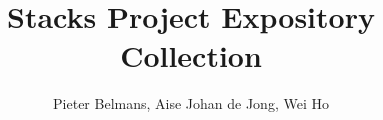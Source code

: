 \documentclass[conferencestyle]{cambridge7B}
\theoremstyle{plain}
\theoremstyle{definition}
\theoremstyle{definition}
\begin{document}
\title{Stacks Project Expository Collection}
\author{Pieter Belmans, Aise Johan de Jong, Wei Ho}

\frontmatter

\setcounter{page}{3}
\maketitle
\tableofcontents
\cleardoublepage
\listofcontributors
\cleardoublepage

\mainmatter
\setcounter{page}{1}

\end{document}
